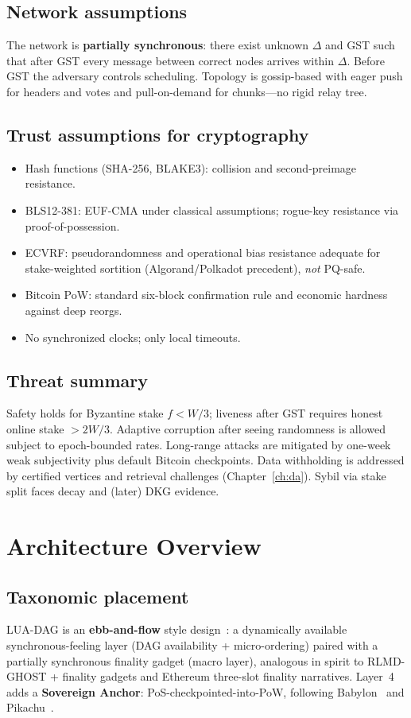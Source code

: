 \documentclass[11pt,a4paper,twoside]{report}
\theoremstyle{definition}
\begin{document}
\section{Network assumptions}
The network is \textbf{partially synchronous}: there exist unknown $\Delta$ and GST such that after GST every message between correct nodes arrives within $\Delta$. Before GST the adversary controls scheduling. Topology is gossip-based with eager push for headers and votes and pull-on-demand for chunks---no rigid relay tree.

\section{Trust assumptions for cryptography}
\begin{itemize}[leftmargin=*]
  \item Hash functions (SHA-256, BLAKE3): collision and second-preimage resistance.
  \item BLS12-381: EUF-CMA under classical assumptions; rogue-key resistance via proof-of-possession.
  \item ECVRF: pseudorandomness and operational bias resistance adequate for stake-weighted sortition (Algorand/Polkadot precedent), \emph{not} PQ-safe.
  \item Bitcoin PoW: standard six-block confirmation rule and economic hardness against deep reorgs.
  \item No synchronized clocks; only local timeouts.
\end{itemize}

\section{Threat summary}
Safety holds for Byzantine stake $f < W/3$; liveness after GST requires honest online stake $> 2W/3$. Adaptive corruption after seeing randomness is allowed subject to epoch-bounded rates. Long-range attacks are mitigated by one-week weak subjectivity plus default Bitcoin checkpoints. Data withholding is addressed by certified vertices and retrieval challenges (Chapter~\ref{ch:da}). Sybil via stake split faces decay and (later) DKG evidence.

\chapter{Architecture Overview}
\label{ch:arch}

\section{Taxonomic placement}
LUA-DAG is an \textbf{ebb-and-flow} style design~\cite{neu2021ebb}: a dynamically available synchronous-feeling layer (DAG availability + micro-ordering) paired with a partially synchronous finality gadget (macro layer), analogous in spirit to RLMD-GHOST + finality gadgets and Ethereum three-slot finality narratives. Layer~4 adds a \textbf{Sovereign Anchor}: PoS-checkpointed-into-PoW, following Babylon~\cite{tas2022babylon} and Pikachu~\cite{azouvi2022pikachu}.
\end{document}
